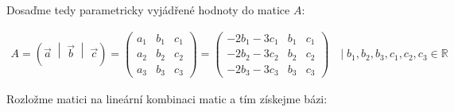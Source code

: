\documentclass[12pt]{article}
\begin{document}
\begin{enumerate}
    Dosaďme tedy parametricky vyjádřené hodnoty do matice $A$:
    
    \renewcommand{\arraystretch}{1.4}
    \begin{align*}
      A = \left(\vec{a} \;\middle|\; \vec{b} \;\middle|\; \vec{c}\right)
        = \left(\begin{array}{ccc}
          a_1 & b_1 & c_1 \\
          a_2 & b_2 & c_2 \\
          a_3 & b_3 & c_3
        \end{array}\right)
        = \left(\begin{array}{ccc}
          -2b_1-3c_1 & b_1 & c_1 \\
          -2b_2-3c_2 & b_2 & c_2 \\
          -2b_3-3c_3 & b_3 & c_3
        \end{array}\right) \quad | \;b_1, b_2, b_3, c_1, c_2, c_3 \in \mathbb{R}
    \end{align*}

    Rozložme matici na lineární kombinaci matic a tím získejme bázi:


\end{enumerate}
\end{document}
